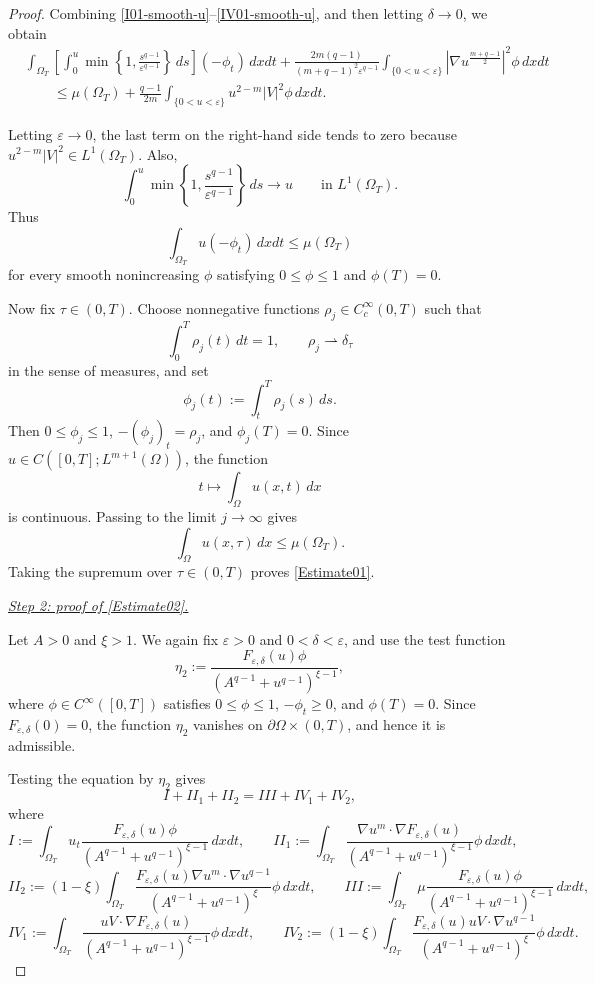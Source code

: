 \documentclass[10pt,a4paper]{amsart}
\begin{document}
\begin{proof}
Combining \eqref{I01-smooth-u}--\eqref{IV01-smooth-u}, and then letting
$\delta\to0$, we obtain
\begin{equation}\label{comp1-smooth-u}
\begin{aligned}
&\int_{\Omega_T}
\left[
\int_0^u
\min\left\{1,\frac{s^{q-1}}{\varepsilon^{q-1}}\right\}\,ds
\right]
(-\phi_t)\,dxdt
+
\frac{2m(q-1)}
{(m+q-1)^2\varepsilon^{q-1}}
\int_{\{0<u<\varepsilon\}}
\left|\nabla u^{\frac{m+q-1}{2}}\right|^2\phi\,dxdt  \\
&\qquad\le
\mu(\Omega_T)
+
\frac{q-1}{2m}
\int_{\{0<u<\varepsilon\}}
u^{2-m}|V|^2\phi\,dxdt.
\end{aligned}
\end{equation}

Letting $\varepsilon\to0$, the last term on the right-hand side tends to
zero because $u^{2-m}|V|^2\in L^1(\Omega_T)$. Also,
\[
\int_0^u
\min\left\{1,\frac{s^{q-1}}{\varepsilon^{q-1}}\right\}\,ds
\longrightarrow u
\qquad\text{in }L^1(\Omega_T).
\]
Thus
\[
\int_{\Omega_T}u(-\phi_t)\,dxdt
\le
\mu(\Omega_T)
\]
for every smooth nonincreasing $\phi$ satisfying
$0\le\phi\le1$ and $\phi(T)=0$.

Now fix $\tau\in(0,T)$. Choose nonnegative functions
$\rho_j\in C_c^\infty(0,T)$ such that
\[
\int_0^T\rho_j(t)\,dt=1,
\qquad
\rho_j\rightharpoonup\delta_\tau
\]
in the sense of measures, and set
\[
\phi_j(t):=\int_t^T\rho_j(s)\,ds.
\]
Then $0\le\phi_j\le1$, $-(\phi_j)_t=\rho_j$, and $\phi_j(T)=0$.
Since $u\in C([0,T];L^{m+1}(\Omega))$, the function
\[
t\mapsto\int_\Omega u(x,t)\,dx
\]
is continuous. Passing to the limit $j\to\infty$ gives
\[
\int_\Omega u(x,\tau)\,dx
\le
\mu(\Omega_T).
\]
Taking the supremum over $\tau\in(0,T)$ proves \eqref{Estimate01}.

\bigskip
\noindent
\underline{\emph{Step 2: proof of \eqref{Estimate02}.}}

Let $A>0$ and $\xi>1$. We again fix $\varepsilon>0$ and
$0<\delta<\varepsilon$, and use the test function
\[
\eta_2:=
\frac{F_{\varepsilon,\delta}(u)\phi}
{\left(A^{q-1}+u^{q-1}\right)^{\xi-1}},
\]
where $\phi\in C^\infty([0,T])$ satisfies $0\le\phi\le1$, $ -\phi_t\ge0$, and $\phi(T)=0$.
Since $F_{\varepsilon,\delta}(0)=0$, the function $\eta_2$ vanishes on
$\partial\Omega\times(0,T)$, and hence it is admissible.

Testing the equation by $\eta_2$ gives
\[
I+II_1+II_2=III+IV_1+IV_2,
\]
where
\[
I:=
\int_{\Omega_T}
u_t
\frac{F_{\varepsilon,\delta}(u)\phi}
{\left(A^{q-1}+u^{q-1}\right)^{\xi-1}}
\,dxdt,
\qquad
II_1:=
\int_{\Omega_T}
\frac{
\nabla u^m\cdot\nabla F_{\varepsilon,\delta}(u)
}
{\left(A^{q-1}+u^{q-1}\right)^{\xi-1}}
\phi\,dxdt,
\]
\[
II_2:=
(1-\xi)
\int_{\Omega_T}
\frac{
F_{\varepsilon,\delta}(u)
\nabla u^m\cdot\nabla u^{q-1}
}
{\left(A^{q-1}+u^{q-1}\right)^\xi}
\phi\,dxdt,
\qquad
III:=
\int_{\Omega_T}
\mu
\frac{F_{\varepsilon,\delta}(u)\phi}
{\left(A^{q-1}+u^{q-1}\right)^{\xi-1}}
\,dxdt,
\]
\[
IV_1:=
\int_{\Omega_T}
\frac{
uV\cdot\nabla F_{\varepsilon,\delta}(u)
}
{\left(A^{q-1}+u^{q-1}\right)^{\xi-1}}
\phi\,dxdt,
\qquad
IV_2:=
(1-\xi)
\int_{\Omega_T}
\frac{
F_{\varepsilon,\delta}(u)
uV\cdot\nabla u^{q-1}
}
{\left(A^{q-1}+u^{q-1}\right)^\xi}
\phi\,dxdt.
\]


\end{proof}
\end{document}
